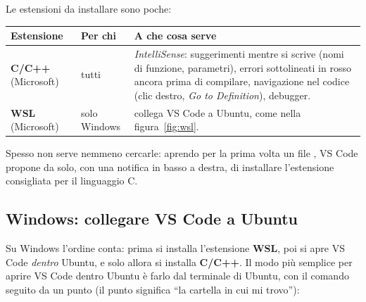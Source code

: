 Le estensioni da installare sono poche:

\begin{center}
\renewcommand{\arraystretch}{1.45}
\begin{tabular}{@{}>{\raggedright\arraybackslash}p{3.2cm}>{\raggedright\arraybackslash}p{2.4cm}>{\raggedright\arraybackslash}p{10.6cm}@{}}
  \toprule
  \textbf{Estensione} & \textbf{Per chi} & \textbf{A che cosa serve} \\
  \midrule
  \textbf{C/C++} (Microsoft) & tutti &
    \textit{IntelliSense}: suggerimenti mentre si scrive (nomi di funzione,
    parametri), errori sottolineati in rosso ancora prima di compilare,
    navigazione nel codice (clic destro, \textit{Go to Definition}),
    debugger. \\
  \textbf{WSL} (Microsoft) & solo Windows &
    collega VS Code a Ubuntu, come nella figura~\ref{fig:wsl}. \\
  \bottomrule
\end{tabular}
\end{center}

Spesso non serve nemmeno cercarle: aprendo per la prima volta un file
, VS Code propone da solo, con una notifica in basso a destra, di
installare l'estensione consigliata per il linguaggio C.


\subsection{Windows: collegare VS Code a Ubuntu}

Su Windows l'ordine conta: prima si installa l'estensione \textbf{WSL}, poi
si apre VS Code \textit{dentro} Ubuntu, e solo allora si installa
\textbf{C/C++}. Il modo più semplice per aprire VS Code dentro Ubuntu è
farlo dal terminale di Ubuntu, con il comando  seguito da un
punto (il punto significa “la cartella in cui mi trovo”):


